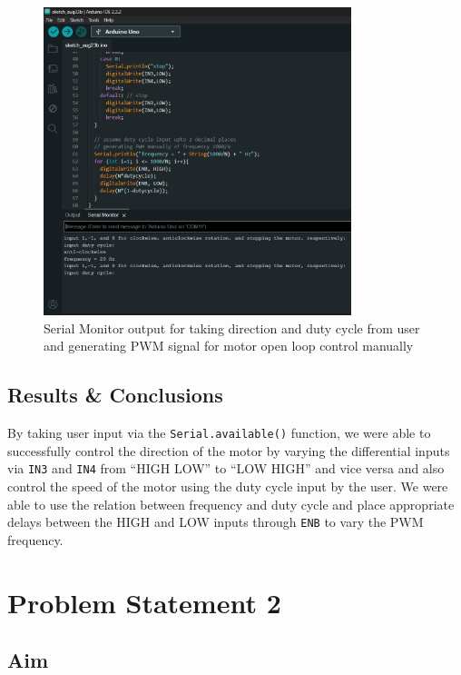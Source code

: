 \documentclass[12pt]{article}
\begin{document}
\begin{figure}[h]
    \centering
    \includegraphics[width=0.8\textwidth]{images/manualpwm.png}
    \caption{Serial Monitor output for taking direction and duty cycle from user and generating PWM signal for motor open loop control manually}
\end{figure}

\subsection{Results \& Conclusions}

By taking user input via the \texttt{Serial.available()} function, we were able to successfully control the direction of the motor by varying the differential inputs via \texttt{IN3} and \texttt{IN4} from “HIGH LOW” to “LOW HIGH” and vice versa and also control the speed of the motor using the duty cycle input by the user. We were able to use the relation between frequency and duty cycle and place appropriate delays between the HIGH and LOW inputs through \texttt{ENB} to vary the PWM frequency.


\pagebreak
\section{Problem Statement 2}

\subsection{Aim}
\end{document}
